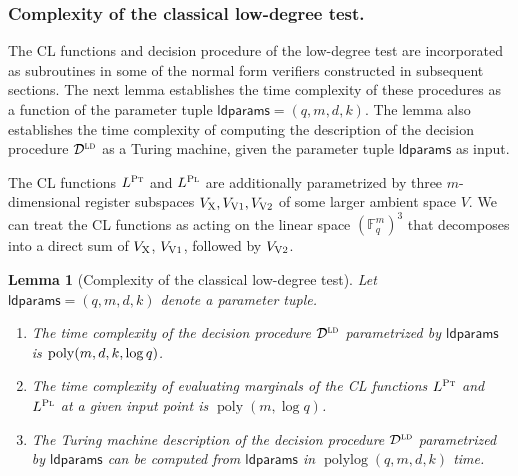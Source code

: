 \documentclass[11pt]{article}
\newtheorem{lemma}[theorem]{Lemma}
\theoremstyle{definition}
\newcommand{\F}{\ensuremath{\mathbb{F}}}
\newcommand{\ld}{\textsc{ld}}
\DeclareMathOperator{\poly}{poly}
\DeclareMathOperator{\polylog}{polylog}
\newcommand{\decider}{\mathcal{D}}
\newcommand{\labelstyle}[1]{\ensuremath{\textsc{#1}}\xspace}
\newcommand{\xpt}{\labelstyle{X}}
\newcommand{\dir}[1]{\labelstyle{V#1}}
\newcommand{\plf}{\labelstyle{Pl}}
\newcommand{\ptf}{\labelstyle{Pt}}
\newcommand{\ldparams}{\mathsf{ldparams}}
\newcommand{\tnote}[1]{}
\newcommand{\jnote}[1]{}
\begin{document}
\subsubsection{Complexity of the classical low-degree test.}
The CL functions and decision procedure of the low-degree test are incorporated
as subroutines in some of the normal form verifiers constructed in subsequent
sections.
The next lemma establishes the time complexity of these procedures as a function
of the parameter tuple $\ldparams = (q,m,d,k)$.
The lemma also establishes the time complexity of computing the {description} of
the decision procedure $\decider^\ld$ as a Turing machine, given the parameter
tuple $\ldparams$ as input.

The CL functions $L^\ptf$ and $L^\plf$ are additionally parametrized by three
$m$-dimensional register subspaces $V_\xpt, V_{\dir{1}}, V_{\dir{2}}$ of some
larger ambient space $V$.
We can treat the CL functions as acting on the linear space $(\F_q^m)^3$ that
decomposes into a direct sum of $V_\xpt$, $V_{\dir{1}}$, followed by
$V_{\dir{2}}$.

\begin{lemma}[Complexity of the classical low-degree test]
  \label{lem:ld-complexity}
  Let $\ldparams = (q,m,d,k)$ denote a parameter tuple.
  \begin{enumerate}
	\item The time complexity of the decision procedure $\decider^\ld$
    parametrized by $\ldparams$ is $\poly(m, d, k, \break \log q)$.
	\item The time complexity of evaluating marginals of the CL functions $L^\ptf$
    and $L^\plf$ at a given input point is $\poly(m, \log q)$.
	\item The Turing machine description of the decision procedure $\decider^\ld$
    parametrized by $\ldparams$ can be computed from $\ldparams$ in $\polylog
    (q,m,d,k)$ time.
  \end{enumerate}
\end{lemma}
\end{document}
